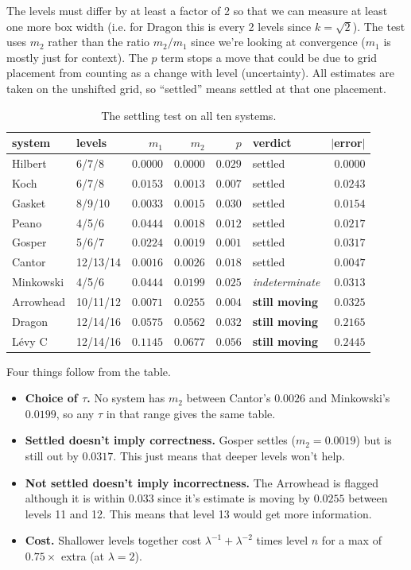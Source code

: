 \documentclass[11pt, a4paper]{article}
\theoremstyle{plain}
\theoremstyle{definition}
\theoremstyle{remark}
\begin{document}
\noindent The levels must differ by at least a factor of 2 so that we can measure at least one more box width (i.e. for Dragon this is every 2 levels since $k=\sqrt2$). 
The test uses $m_2$ rather than the ratio $m_2/m_1$ since we're looking at convergence ($m_1$ is mostly just for context).
The $p$ term stops a move that could be due to grid placement from counting as a change with level (uncertainty).
All estimates are taken on the unshifted grid, so ``settled'' means settled at that one placement.

\begin{table}[H]
\centering
\begin{tabular}{llrrrlr}
\hline
system & levels & $m_1$ & $m_2$ & $p$ & verdict & $|$error$|$ \\
\hline
Hilbert   & 6/7/8    & $0.0000$ & $0.0000$ & $0.029$ & settled & $0.0000$ \\
Koch      & 6/7/8    & $0.0153$ & $0.0013$ & $0.007$ & settled & $0.0243$ \\
Gasket    & 8/9/10   & $0.0033$ & $0.0015$ & $0.030$ & settled & $0.0154$ \\
Peano     & 4/5/6    & $0.0444$ & $0.0018$ & $0.012$ & settled & $0.0217$ \\
Gosper    & 5/6/7    & $0.0224$ & $0.0019$ & $0.001$ & settled & $0.0317$ \\
Cantor    & 12/13/14 & $0.0016$ & $0.0026$ & $0.018$ & settled & $0.0047$ \\
\hline
Minkowski & 4/5/6    & $0.0444$ & $0.0199$ & $0.025$ & \emph{indeterminate} & $0.0313$ \\
\hline
Arrowhead & 10/11/12 & $0.0071$ & $0.0255$ & $0.004$ & \textbf{still moving} & $0.0325$ \\
Dragon    & 12/14/16 & $0.0575$ & $0.0562$ & $0.032$ & \textbf{still moving} & $0.2165$ \\
L\'evy C  & 12/14/16 & $0.1145$ & $0.0677$ & $0.056$ & \textbf{still moving} & $0.2445$ \\
\hline
\end{tabular}
\caption{The settling test on all ten systems.}
\label{tab:levels}
\end{table}

\noindent Four things follow from the table.
\begin{itemize}
    \item \textbf{Choice of $\tau$.} No system has $m_2$ between Cantor's
    $0.0026$ and Minkowski's $0.0199$, so any $\tau$ in that range gives the same table.
    \item \textbf{Settled doesn't imply correctness.} Gosper settles ($m_2=0.0019$) but is still out by $0.0317$. This just means that deeper levels won't help.
    \item \textbf{Not settled doesn't imply incorrectness.} 
    The Arrowhead is flagged although it is within $0.033$ since it's estimate is moving by $0.0255$ between levels 11 and 12. This means that level 13 would get more information.
    \item \textbf{Cost.} Shallower levels together cost $\lambda^{-1}+\lambda^{-2}$ times level $n$ for a max of $0.75\times$ extra (at $\lambda=2$).
\end{itemize}
\end{document}
